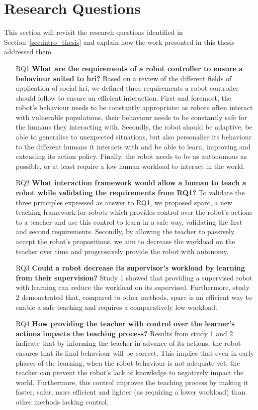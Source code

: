 \section{Research Questions}
This section will revisit the research questions identified in Section~\ref{sec:intro_thesis} and explain how the work presented in this thesis addressed them.
\begin{itemize}
\item [RQ1] \textbf{What are the requirements of a robot controller to ensure a behaviour suited to \gls{hri}?} 
Based on a review of the different fields of application of social \gls{hri}, we defined three requirements a robot controller should follow to ensure an efficient interaction. First and foremost, the robot's behaviour needs to be constantly appropriate: as robots often interact with vulnerable populations, their behaviour needs to be constantly safe for the humans they interacting with. Secondly, the robot should be adaptive, be able to generalise to unexpected situations, but also personalise its behaviour to the different humans it interacts with and be able to learn, improving and extending its action policy. Finally, the robot needs to be as autonomous as possible, or at least require a low human workload to interact in the world.

\item [RQ2] \textbf{What interaction framework would allow a human to teach a robot while validating the requirements from RQ1?}
To validate the three principles expressed as answer to RQ1, we proposed \gls{sparc}, a new teaching framework for robots which provides control over the robot's actions to a teacher and use this control to learn in a safe way, validating the first and second requirements. Secondly, by allowing the teacher to passively accept the robot's propositions, we aim to decrease the workload on the teacher over time and progressively provide the robot with autonomy. 

\item [RQ3] \textbf{Could a robot decrease its supervisor's workload by learning from their supervision?}
Study 1 showed that providing a supervised robot with learning can reduce the workload on its supervised. Furthermore, study 2 demonstrated that, compared to other methods, \gls{sparc} is an efficient way to enable a safe teaching and requires a comparatively low workload.

\item [RQ4] \textbf{How providing the teacher with control over the learner's actions impacts the teaching process?} 
Results from study 1 and 2 indicate that by informing the teacher in advance of its actions, the robot ensures that its final behaviour will be correct. This implies that even in early phases of the learning, when the robot behaviour is not adequate yet, the teacher can prevent the robot's lack of knowledge to negatively impact the world. Furthermore, this control improves the teaching process by making it faster, safer, more efficient and lighter (as requiring a lower workload) than other methods lacking control.


\end{itemize}
